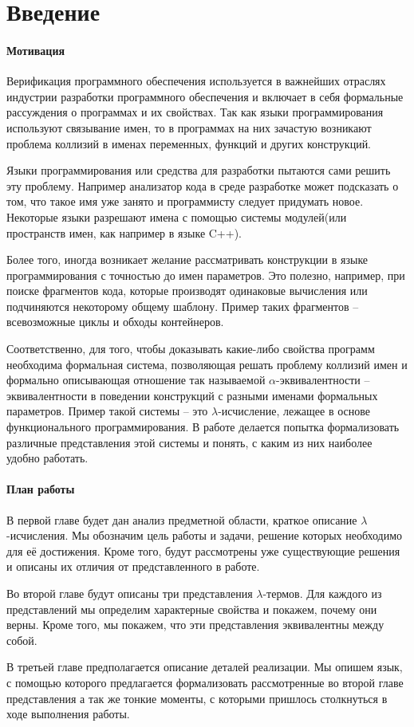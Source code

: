 \section*{Введение}

\paragraph{Мотивация}
Верификация программного обеспечения используется в важнейших отраслях индустрии разработки программного обеспечения и включает в себя формальные рассуждения о программах и их свойствах. Так как языки программирования используют связывание имен, то в программах на них зачастую возникают проблема коллизий в именах переменных, функций и других конструкций.

Языки программирования или средства для разработки пытаются сами решить эту проблему. Например анализатор кода в среде разработке может подсказать о том, что такое имя уже занято и программисту следует придумать новое. Некоторые языки разрешают имена с помощью системы модулей(или пространств имен, как например в языке C++).

Более того, иногда возникает желание рассматривать конструкции в языке программирования с точностью до имен параметров. Это полезно, например, при поиске фрагментов кода, которые производят одинаковые вычисления или подчиняются некоторому общему шаблону. Пример таких фрагментов -- всевозможные циклы и обходы контейнеров.

Соответственно, для того, чтобы доказывать какие-либо свойства программ необходима формальная система, позволяющая решать проблему коллизий имен и формально описывающая отношение так называемой $\alpha$-эквивалентности -- эквивалентности в поведении конструкций с разными именами формальных параметров. Пример такой системы -- это $\lambda$-исчисление, лежащее в основе функционального программирования. В работе делается попытка формализовать различные представления этой системы и понять, с каким из них наиболее удобно работать.

\paragraph{План работы}

В первой главе будет дан анализ предметной области, краткое описание $\lambda$-исчисления. Мы обозначим цель работы и задачи, решение которых необходимо для её достижения. Кроме того, будут рассмотрены уже существующие решения и описаны их отличия от представленного в работе.

Во второй главе будут описаны три представления $\lambda$-термов. Для каждого из представлений мы определим характерные свойства и покажем, почему они верны. Кроме того, мы покажем, что эти представления эквивалентны между собой.

В третьей главе предполагается описание деталей реализации. Мы опишем язык, с помощью которого предлагается формализовать рассмотренные во второй главе представления а так же тонкие моменты, с которыми пришлось столкнуться в ходе выполнения работы.
